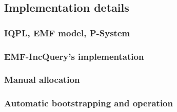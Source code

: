 \subsection{Implementation details}

\subsubsection{IQPL, EMF model, P-System}

\subsubsection{EMF-IncQuery's implementation}

\subsubsection{Manual allocation}

\subsubsection{Automatic bootstrapping and operation}


